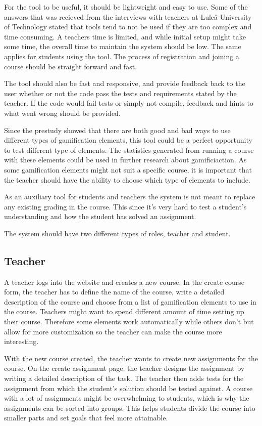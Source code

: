 For the tool to be useful, it should be lightweight and easy to use. Some of the answers that was recieved from the interviews with teachers at Luleå University of Technology stated that tools tend to not be used if they are too complex and time consuming. A teachers time is limited, and while initial setup might take some time, the overall time to maintain the system should be low. The same applies for students using the tool. The process of registration and joining a course should be straight forward and fast.

The tool should also be fast and responsive, and provide feedback back to the user whether or not the code pass the tests and requirements stated by the teacher. If the code would fail tests or simply not compile, feedback and hints to what went wrong should be provided.

Since the prestudy showed that there are both good and bad ways to use different types of gamification elements, this tool could be a perfect opportunity to test different type of elements. The statistics generated from running a course with these elements could be used in further research about gamificiaction. As some gamification elements might not suit a specific course, it is important that the teacher should have the ability to choose which type of elements to include. 

As an auxiliary tool for students and teachers the system is not meant to replace any existing grading in the course. This since it's very hard to test a student's understanding and how the student has solved an assignment. 

The system should have two different types of roles, teacher and student.

\subsection{Teacher}
A teacher logs into the website and creates a new course. In the create course form, the teacher has to define the name of the course, write a detailed description of the course and choose from a list of gamification elements to use in the course. Teachers might want to spend different amount of time setting up their course. Therefore some elements work automatically while others don't but allow for more customization so the teacher can make the course more interesting.

With the new course created, the teacher wants to create new assignments for the course. On the create assignment page, the teacher designs the assignment by writing a detailed description of the task. The teacher then adds tests for the assignment from which the student's solution should be tested against. A course with a lot of assignments might be overwhelming to students, which is why the assignments can be sorted into groups. This helps students divide the course into smaller parts and set goals that feel more attainable.

